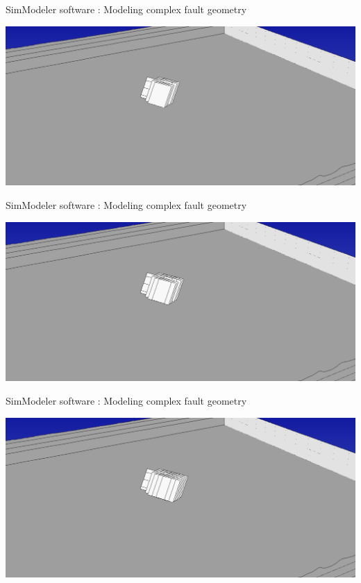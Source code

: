 \documentclass{beamer}
\begin{document}
\begin{frame}
 {SimModeler software : Modeling complex fault geometry}
 
 \includegraphics[width=1\linewidth]{images/simmodeler8}
 
\end{frame}

\begin{frame}
 {SimModeler software : Modeling complex fault geometry}
 
 \includegraphics[width=1\linewidth]{images/simmodeler9}
 
\end{frame}

\begin{frame}
 {SimModeler software : Modeling complex fault geometry}
 
 \includegraphics[width=1\linewidth]{images/simmodeler10}
 
\end{frame}
\end{document}
